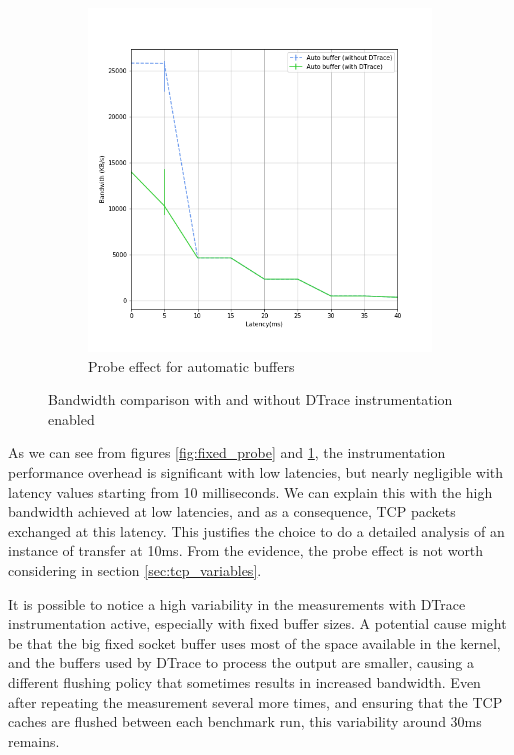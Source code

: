 \documentclass[a4paper,10pt]{article}
\begin{document}
\begin{figure}[]
\begin{subfigure}{0.5\textwidth}
   \includegraphics[width=\textwidth]{images/auto_probe_effect.png}
    \caption{Probe effect for automatic buffers}
    \label{fig:auto_probe}
\end{subfigure}

\caption[short]{Bandwidth comparison with and without DTrace instrumentation enabled}
\label{fig:probe_effect}
\end{figure}

As we can see from figures \ref{fig:fixed_probe} and \ref{fig:auto_probe}, the instrumentation performance overhead is significant with low latencies, but nearly negligible with latency values starting from 10 milliseconds. We can explain this with the high bandwidth achieved at low latencies, and as a consequence, TCP packets exchanged at this latency. This justifies the choice to do a detailed analysis of an instance of transfer at 10ms. From the evidence, the probe effect is not worth considering in section \ref{sec:tcp_variables}.

It is possible to notice a high variability in the measurements with DTrace instrumentation active, especially with fixed buffer sizes. A potential cause might be that the big fixed socket buffer uses most of the space available in the kernel, and the buffers used by DTrace to process the output are smaller, causing a different flushing policy that sometimes results in increased bandwidth. Even after repeating the measurement several more times, and ensuring that the TCP caches are flushed between each benchmark  run, this variability around 30ms remains.
\end{document}
